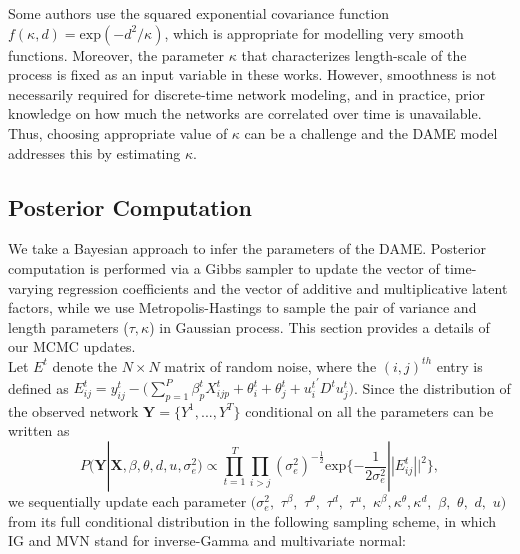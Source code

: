 \documentclass[a4paper]{article}
\begin{document}
Some authors \citep{bhattacharya2011sparse,durante2013nonparametric,durante2014bayesian} use the squared exponential covariance function $f(\kappa, d) = \mbox{exp}(-d^2/{\kappa})$, which is appropriate for modelling very smooth functions. Moreover, the parameter $\kappa$ that characterizes length-scale of the process is fixed as an input variable in these works. However, smoothness is not necessarily required for discrete-time network modeling, and in practice, prior knowledge on how much the networks are correlated over time is unavailable. Thus, choosing appropriate value of $\kappa$ can be a challenge and the DAME model addresses this by estimating $\kappa$.

\subsection{Posterior Computation}\label{subsec: posterior computation}
We take a Bayesian approach to infer the parameters of the DAME. Posterior computation is performed via a Gibbs sampler to update the vector of time-varying regression coefficients and the vector of additive and multiplicative latent factors, while we use Metropolis-Hastings to sample the pair of variance and length parameters ($\tau, \kappa$) in Gaussian process. This section provides a details of our MCMC updates.\\ \newline
Let $E^t$ denote the $N \times N$ matrix of random noise, where the $(i, j)^{th}$ entry is defined as $E^t_{ij} = y^t_{ij}-\big(\sum\limits_{p=1}^P \beta^t_{p}X^t_{ijp}+\theta^t_{i}+\theta^t_{j}+{u^t_{i}}^\prime D^tu^t_{j}\big)$. Since the distribution of the observed network $\mathbf{Y}= \{Y^1,...,Y^T\}$ conditional on all the parameters can be written as
\begin{equation}
	P(\boldsymbol{Y}|\boldsymbol{X}, {\beta}, {\theta}, {d}, {u},\sigma_e^2)\propto  \prod_{t=1}^T\prod_{i>j}(\sigma_e^2)^{-\frac{1}{2}}\mbox{exp}\{-\frac{1}{2\sigma_e^2}||E^t_{ij}||^2\},
\end{equation}
we sequentially update each parameter $(\sigma_e^2,$ $\tau^{\beta},$ $\tau^{\theta}, $ $\tau^{d},$ $\tau^{u},$ $\kappa^\beta, \kappa^\theta, \kappa^d,$ $\beta, $ $\theta,$ $d,$ $u)$ from its full conditional distribution in the following sampling scheme, in which IG and MVN stand for inverse-Gamma and multivariate normal:
\end{document}
